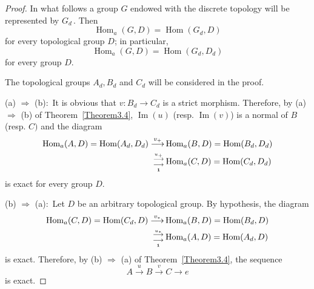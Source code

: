 \documentclass[12pt]{amsart}
\theoremstyle{theorem}
\theoremstyle{definition}
\theoremstyle{remark} \theoremstyle{question} \theoremstyle{example}
\def\Hom{\operatorname{{Hom}}}
\def\mI{\operatorname{{Im}}}
\begin{document}
\begin{proof}
In what follows a group $G$ endowed with the discrete topology will be
represented by $G_d$\,. Then
$$
\Hom_a(G,D) = \Hom(G_d,D)
$$
for every topological group $D$; in particular,
$$
\Hom_a(G,D) = \Hom(G_d,D_d)
$$
for every group $D$.

The topological groups $A_d, B_d$ and $C_d$ will be considered in the proof.

\smallskip

\noindent (a) $\Rightarrow$ (b):\, It is obvious that  $v\colon B_d \to C_d$ is a strict morphism. Therefore, by
(a) $\Rightarrow$ (b) of Theorem~\ref{Theorem3.4}, $\mI(u)$ (resp. $\mI(v)$)
is a normal of $B$ (resp. $C)$ and the diagram
\begin{align*}
\Hom_a(A,D) = \Hom(A_d,D_d) \overset{v_+}{\longrightarrow} &\Hom_a(B,D) = \Hom(B_d,D_d)\\
{}^{\overset{u_+}{\longrightarrow}}_{\underset{\bf 1}{\longrightarrow}} &\Hom_a(C,D) = \Hom(C_d,D_d)
\end{align*}
is exact for every group $D$.

\smallskip

\noindent (b) $\Rightarrow$ (a):\, Let $D$ be an arbitrary topological group.
By hypothesis, the diagram
\begin{align*}
\Hom_a(C,D) = \Hom(C_d,D) \overset{v_*}{\longrightarrow} &\Hom_a(B,D) = \Hom(B_d,D)\\
{}^{\overset{u_*}{\longrightarrow}}_{\underset{\bf 1}{\longrightarrow}} &\Hom_a(A,D) = \Hom(A_d,D)
\end{align*}
is exact. Therefore, by (b) $\Rightarrow$ (a) of Theorem~\ref{Theorem3.4},
the sequence
$$
A \overset{u}{\longrightarrow} B \overset{v}{\longrightarrow} C \longrightarrow e
$$
is exact.
\end{proof}


\end{document}
